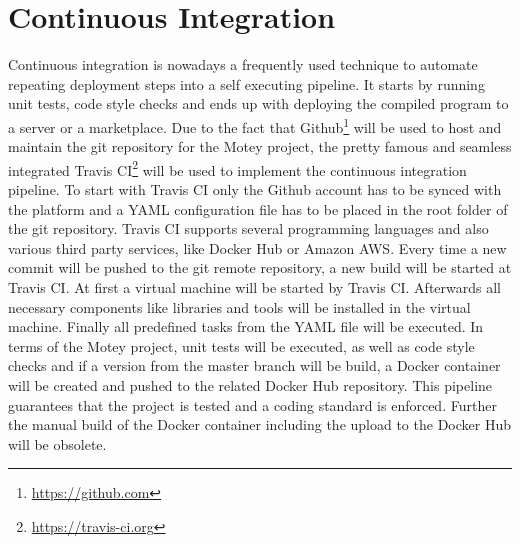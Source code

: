 \section{Continuous Integration}
Continuous integration is nowadays a frequently used technique to automate repeating deployment steps into a self executing pipeline.
It starts by running unit tests, code style checks and ends up with deploying the compiled program to a server or a marketplace.
Due to the fact that Github\footnote{\url{https://github.com}} will be used to host and maintain the git repository for the Motey project, the pretty famous and seamless integrated Travis CI\footnote{\url{https://travis-ci.org}} will be used to implement the continuous integration pipeline.
To start with Travis CI only the Github account has to be synced with the platform and a \ac{YAML} configuration file has to be placed in the root folder of the git repository.
Travis CI supports several programming languages and also various third party services, like Docker Hub or Amazon AWS.
Every time a new commit will be pushed to the git remote repository, a new build will be started at Travis CI.
At first a virtual machine will be started by Travis CI.
Afterwards all necessary components like libraries and tools will be installed in the virtual machine.
Finally all predefined tasks from the \ac{YAML} file will be executed.
In terms of the Motey project, unit tests will be executed, as well as code style checks and if a version from the master branch will be build, a Docker container will be created and pushed to the related Docker Hub repository.
This pipeline guarantees that the project is tested and a coding standard is enforced.
Further the manual build of the Docker container including the upload to the Docker Hub will be obsolete.
